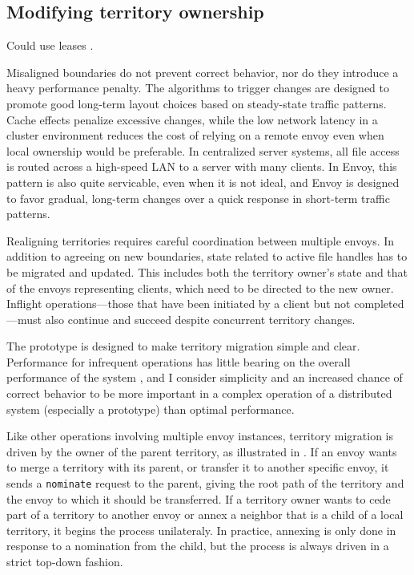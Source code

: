 
\subsection{Modifying territory ownership}

Could use leases \cite{gray89}.

Misaligned boundaries do not prevent correct behavior, nor do they introduce a heavy performance penalty. The algorithms to trigger changes are designed to promote good long-term layout choices based on steady-state traffic patterns. Cache effects penalize excessive changes, while the low network latency in a cluster environment reduces the cost of relying on a remote envoy even when local ownership would be preferable. In centralized server systems, all file access is routed across a high-speed LAN to a server with many clients. In Envoy, this pattern is also quite servicable, even when it is not ideal, and Envoy is designed to favor gradual, long-term changes over a quick response in short-term traffic patterns.

Realigning territories requires careful coordination between multiple envoys. In addition to agreeing on new boundaries, state related to active file handles has to be migrated and updated. This includes both the territory owner's state and that of the envoys representing clients, which need to be directed to the new owner. Inflight operations---those that have been initiated by a client but not completed---must also continue and succeed despite concurrent territory changes.

The prototype is designed to make territory migration simple and clear. Performance for infrequent operations has little bearing on the overall performance of the system \cite{amdahl}, and I consider simplicity and an increased chance of correct behavior to be more important in a complex operation of a distributed system (especially a prototype) than optimal performance.

Like other operations involving multiple envoy instances, territory migration is driven by the owner of the parent territory, as illustrated in . If an envoy wants to merge a territory with its parent, or transfer it to another specific envoy, it sends a \texttt{nominate} request to the parent, giving the root path of the territory and the envoy to which it should be transferred. If a territory owner wants to cede part of a territory to another envoy or annex a neighbor that is a child of a local territory, it begins the process unilateraly. In practice, annexing is only done in response to a nomination from the child, but the process is always driven in a strict top-down fashion.

